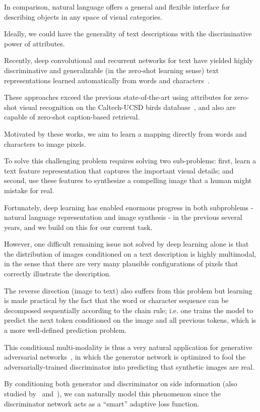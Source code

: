 In comparison, natural language offers a general and flexible interface for describing objects in any space of visual categories.

Ideally, we could have the generality of text descriptions with the discriminative power of attributes.

Recently, deep convolutional and recurrent networks for text have yielded highly discriminative and generalizable (in the zero-shot learning sense) text representations learned automatically from words and characters~\cite{reed2015learning}.

These approaches exceed the previous state-of-the-art using attributes for zero-shot visual recognition on the Caltech-UCSD birds database~\cite{wah2011caltech}, and also are capable of zero-shot caption-based retrieval.

Motivated by these works, we aim to learn a mapping directly from words and characters to image pixels.

To solve this challenging problem requires solving two sub-problems: first, learn a text feature representation that captures the important visual details; and second, use these features to synthesize a compelling image that a human might mistake for real.

Fortunately, deep learning has enabled enormous progress in both subproblems - natural language representation and image synthesis - in the previous several years, and we build on this for our current task.

However, one difficult remaining issue not solved by deep learning alone is that the distribution of images conditioned on a text description is highly multimodal, in the sense that there are very many plausible configurations of pixels that correctly illustrate the description.

The reverse direction (image to text) also suffers from this problem but learning is made practical by the fact that the word or character sequence can be decomposed sequentially according to the chain rule; i.e. one trains the model to predict the next token conditioned on the image and all previous tokens, which is a more well-defined prediction problem.

This conditional multi-modality is thus a very natural application for generative adversarial networks~\cite{goodfellow2014generative}, in which the generator network is optimized to fool the adversarially-trained discriminator into predicting that synthetic images are real.

By conditioning both generator and discriminator on side information (also studied by~\citet{mirza2014conditional} and~\citet{denton2015deep}), we can naturally model this phenomenon since the discriminator network acts as a ``smart'' adaptive loss function.


